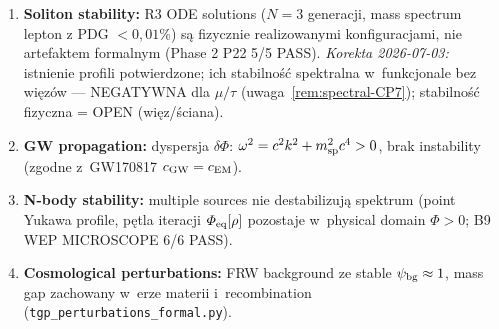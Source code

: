 \begin{remark}%
\label{rem:spectral-synthesis-implications}
\begin{enumerate}[nosep]
  \item \textbf{Soliton stability:} R3 ODE solutions ($N=3$ generacji,
    mass spectrum lepton z PDG $<0{,}01\%$) s\k{a} fizycznie realizowanymi
    konfiguracjami, nie artefaktem formalnym
    (Phase 2 P22 5/5 PASS).
    \emph{Korekta 2026-07-03:} istnienie profili potwierdzone; ich
    stabilno\'s\'c spektralna w~funkcjonale bez wi\k{e}z\'ow ---
    NEGATYWNA dla $\mu/\tau$ (uwaga~\ref{rem:spectral-CP7});
    stabilno\'s\'c fizyczna = OPEN (wi\k{e}z/\'sciana).
  \item \textbf{GW propagation:} dyspersja $\delta\Phi$:
    $\omega^2 = c^2 k^2 + m_{\rm sp}^2 c^4 > 0$, brak instability
    (zgodne z~GW170817 $c_{\rm GW} = c_{\rm EM}$).
  \item \textbf{N-body stability:} multiple sources nie destabilizuj\k{a}
    spektrum (point Yukawa profile, p\k{e}tla iteracji $\Phi_{\rm eq}[\rho]$
    pozostaje w~physical domain $\Phi > 0$;
    B9 WEP MICROSCOPE 6/6 PASS).
  \item \textbf{Cosmological perturbations:} FRW background ze stable
    $\psi_{\rm bg}\approx 1$, mass gap zachowany w~erze materii
    i~recombination
    (\texttt{tgp\_perturbations\_formal.py}).
\end{enumerate}
\end{remark}

